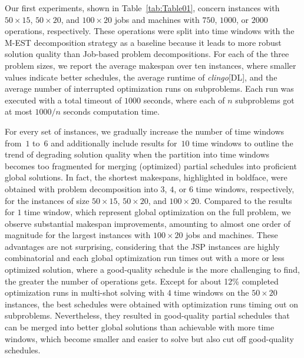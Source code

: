 \documentclass{tlp} %
\newcommand{\clingodl}{\emph{clingo}[DL]\xspace}
\begin{document}
%
Our first experiments, shown in Table~\ref{tab:Table01}, concern instances with $50\times15$, $50\times20$, and $100\times20$ jobs and machines with $750$, $1000$, or $2000$ operations, respectively. These operations were split into time windows with the M-EST decomposition strategy as a baseline because it leads to more robust solution quality than Job-based problem decompositions.
For each of the three problem sizes, we report the average makespan over ten instances, where smaller values indicate better schedules, the average runtime of \clingodl, and the average number of interrupted optimization runs on subproblems.
Each run was executed with a total timeout of $1000$ seconds, where each of $n$ subproblems got at most $1000/n$ seconds computation time.

For every set of instances, we gradually increase the number of time windows from~$1$ to~$6$ and additionally include results for~$10$ time windows to outline the trend of degrading solution quality when the partition into time windows becomes too fragmented for merging (optimized) partial schedules into proficient global solutions.
In fact, the shortest makespans, highlighted in boldface, were obtained with problem decomposition into $3$, $4$, or $6$ time windows, respectively, for the instances of size $50\times15$, $50\times20$, and $100\times20$.
Compared to the results for $1$ time window, 
which represent global optimization on the full problem,
we observe substantial makespan improvements, amounting to almost one order
of magnitude for the largest instances with $100\times20$ jobs and machines.
These advantages are not surprising, considering that the JSP instances are highly combinatorial \citep{shysha18a} and each global optimization run times out with a more or less optimized solution, where a good-quality schedule is the more challenging to find, the greater the number of operations gets.
Except for about 12\% completed optimization runs in multi-shot solving with $4$ time windows on the $50\times20$ instances, the best schedules were obtained with optimization runs timing out on subproblems. 
Nevertheless, they resulted in good-quality partial schedules that can be merged into better global solutions than achievable with more time windows, which become smaller and easier to solve but also cut off good-quality schedules.
\end{document}
